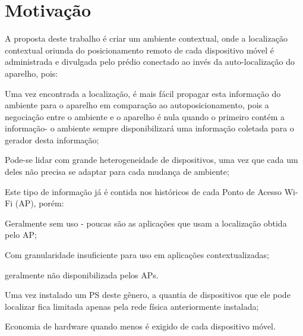 \section{Motivação}
\label{sec:Motivação}

A proposta deste trabalho é criar um ambiente contextual, onde a localização
contextual oriunda do posicionamento remoto de cada dispositivo móvel é
administrada e divulgada pelo prédio conectado ao invés da auto-localização do
aparelho, pois:

\begin{alineas}

	\item Uma vez encontrada a localização, é mais fácil propagar esta informação do
ambiente para o aparelho em comparação ao autoposicionamento, pois a negociação
entre o ambiente e o aparelho é nula quando o primeiro contém a informação- o
ambiente sempre disponibilizará uma informação coletada para o gerador desta
informação;

	\item Pode-se lidar com grande heterogeneidade de dispositivos, uma vez
que cada um deles não precisa se adaptar para cada mudança de ambiente;

	\item Este tipo de informação já é contida nos históricos de cada Ponto de
	Acesso Wi-Fi (AP), porém:

	\begin{alineas}

		\item Geralmente sem uso - poucas são as aplicações que usam a
		localização obtida pelo AP;

		\item Com granularidade insuficiente para uso em aplicações
		contextualizadas;

		\item geralmente não disponibilizada pelos APs.

	\end{alineas}

	\item Uma vez instalado um PS deste gênero, a quantia de dispositivos que
	ele pode localizar fica limitada apenas pela rede física anteriormente
	instalada;

	\item Economia de hardware quando menos é exigido de cada dispositivo móvel.

\end{alineas}

